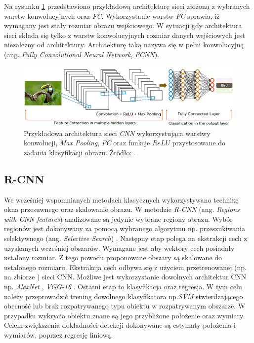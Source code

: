 Na rysunku \ref{fig:example_layers} przedstawiono przykładową architekturę sieci złożoną z wybranych warstw konwolucyjnych oraz \emph{FC}. 
Wykorzystanie warstw \emph{FC} sprawia, iż wymagany jest stały rozmiar obrazu wejściowego.
W sytuacji gdy architektura sieci składa się tylko z warstw konwolucyjnych rozmiar danych wejściowych jest niezależny od architektury. 
Architekturę taką nazywa się w pełni konwolucyjną (ang. \emph{Fully Convolutional Neural Network}, \emph{FCNN}).
\begin{figure}
    \centering
    \includegraphics[width=0.9\linewidth]{images/layers_.png}
    \caption{Przykładowa architektura sieci \emph{CNN} wykorzystująca warstwy konwolucji, \emph{Max Pooling}, \emph{FC} oraz funkcje $ReLU$ przystosowane do zadania klasyfikacji obrazu.
    Źródło: \cite{layers_types}.}
    \label{fig:example_layers}
\end{figure}
 

\subsection{R-CNN}

We wcześniej wspomnianych metodach klasycznych wykorzystywano technikę okna przesuwnego oraz skalowanie obrazu. 
W metodzie \emph{R-CNN} (ang. \emph{Regions with CNN features}) \cite{r_cnn} analizowane są jedynie wybrane regiony obrazu. 
Wybór regionów jest dokonywany za pomocą wybranego algorytmu np. przeszukiwania selektywnego (ang. \emph{Selective Search}) \cite{sel_search}.
Następny etap polega na ekstrakcji cech z uzyskanych wcześniej obszarów.
Wymagane jest aby wektory cech posiadały ustalony rozmiar. 
Z tego powodu proponowane obszary są skalowane do ustalonego rozmiaru.
Ekstrakcja cech odbywa się z użyciem przetrenowanej (np. na zbiorze \cite{imagenet}) sieci CNN.
Możliwe jest wykorzystanie dowolnych architektur CNN np. \emph{AlexNet} \cite{alexnet}, \emph{VGG-16} \cite{vgg}.
Ostatni etap to klasyfikacja oraz regresja.
W tym celu należy przeprowadzić trening dowolnego klasyfikatora np.\emph{SVM} stwierdzającego obecność lub brak rozpatrywanego typu obiektu w rozpatrywanym obszarze.
W przypadku wykrycia obiektu znane są jego przybliżone położenie oraz wymiary.
Celem zwiększenia dokładności detekcji dokonywane są estymaty położenia i wymiarów, poprzez regresję liniową.

